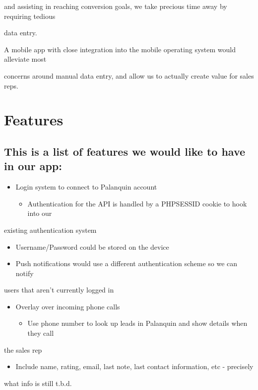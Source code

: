 \documentclass[11pt,a4paper]{article}
\begin{document}
and assisting in reaching conversion goals, we take precious time away by requiring tedious

data entry.

A mobile app with close integration into the mobile operating system would alleviate most

concerns around manual data entry, and allow us to actually create value for sales reps.

\section{Features}

\subsection{This is a list of features we would like to have in our app:}

\begin{itemize}
\item Login system to connect to Palanquin account
\begin{itemize}
\item Authentication for the API is handled by a PHPSESSID cookie to hook into our
\end{itemize}
\end{itemize}
existing authentication system

\begin{itemize}
\item Username/Password could be stored on the device
\item Push notifications would use a different authentication scheme so we can notify
\end{itemize}
users that aren’t currently logged in

\begin{itemize}
\item Overlay over incoming phone calls
\begin{itemize}
\item Use phone number to look up leads in Palanquin and show details when they call
\end{itemize}
\end{itemize}
the sales rep

\begin{itemize}
\item Include name, rating, email, last note, last contact information, etc - precisely
\end{itemize}
what info is still t.b.d.
\end{document}
